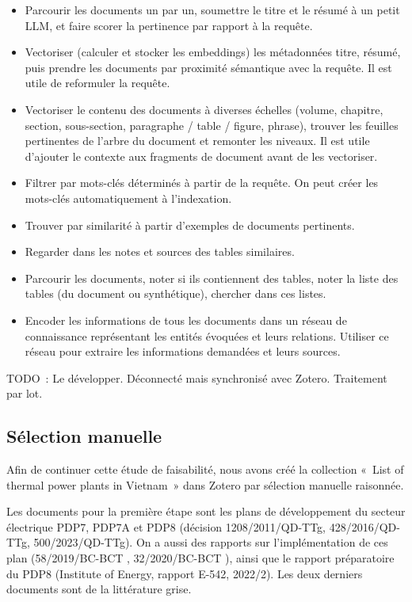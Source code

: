 \documentclass[a4paper,11pt]{report}
\providecommand{\tightlist}{\setlength{\itemsep}{0pt}\setlength{\parskip}{0pt}}
\begin{document}
\begin{itemize}
\tightlist
\item
  Parcourir les documents un par un, soumettre le titre et le résumé à un petit LLM, et faire scorer la pertinence par rapport à la requête.
\item
  Vectoriser (calculer et stocker les embeddings) les métadonnées titre, résumé, puis prendre les documents par proximité sémantique avec la requête. Il est utile de reformuler la requête.
\item
  Vectoriser le contenu des documents à diverses échelles (volume, chapitre, section, sous-section, paragraphe / table / figure, phrase), trouver les feuilles pertinentes de l'arbre du document et remonter les niveaux. Il est utile d'ajouter le contexte aux fragments de document avant de les vectoriser.
\item
  Filtrer par mots-clés déterminés à partir de la requête. On peut créer les mots-clés automatiquement à l'indexation.
\item
  Trouver par similarité à partir d'exemples de documents pertinents.
\item
  Regarder dans les notes et sources des tables similaires.
\item
  Parcourir les documents, noter si ils contiennent des tables, noter la liste des tables (du document ou synthétique), chercher dans ces listes.
\item
  Encoder les informations de tous les documents dans un réseau de connaissance représentant les entités évoquées et leurs relations. Utiliser ce réseau pour extraire les informations demandées et leurs sources.
\end{itemize}

TODO~: Le développer. Déconnecté mais synchronisé avec Zotero. Traitement par lot.

\subsection{Sélection manuelle}\label{suxe9lection-manuelle}

Afin de continuer cette étude de faisabilité, nous avons créé la collection «~List of thermal power plants in Vietnam~» dans Zotero par sélection manuelle raisonnée.

Les documents pour la première étape sont les plans de développement du secteur électrique PDP7, PDP7A et PDP8 (décision 1208/2011/QD-TTg, 428/2016/QD-TTg, 500/2023/QD-TTg). On a aussi des rapports sur l'implémentation de ces plan (58/2019/BC-BCT , 32/2020/BC-BCT ), ainsi que le rapport préparatoire du PDP8 (Institute of Energy, rapport E-542, 2022/2). Les deux derniers documents sont de la littérature grise.
\end{document}
